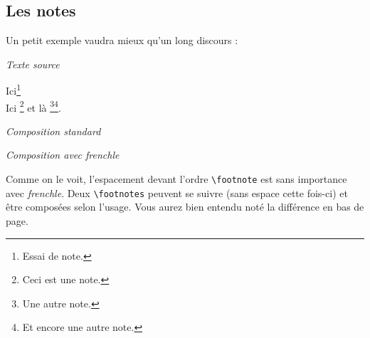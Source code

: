 \documentclass[a4paper,12pt,openright]{article}
\begin{document}
\subsection{Les notes}
Un petit exemple vaudra mieux qu’un long discours :
\begin{center} %
\textit{Texte source}\\
\begin{boxedverbatim}
\noindent Ici\footnote{Essai de note.}\\
          Ici \footnote{Ceci est une note.}
et là \footnote{Une autre note.}\footnote{Et
 encore une autre note.}.
\end{boxedverbatim}
\setcounter{mpfootnote}{1} %
\renewcommand{\thempfootnote}{\arabic{mpfootnote}}
\parbox{60mm}{
\begin{center}
\textit{Composition standard} %
%
\end{center}
}%
\parbox{65mm}{
\begin{center}
\textit{Composition avec frenchle} %
%
\end{center}
}
\end{center}
Comme on le voit, l’espacement devant l’ordre \texttt{{\backslash}footnote} %
est sans importance
avec \textit{frenchle}. Deux \texttt{{\backslash}footnotes} peuvent se suivre (sans espace cette fois-ci)
et être composées selon l’usage. Vous aurez bien entendu noté la différence
en bas de page.
\end{document}
